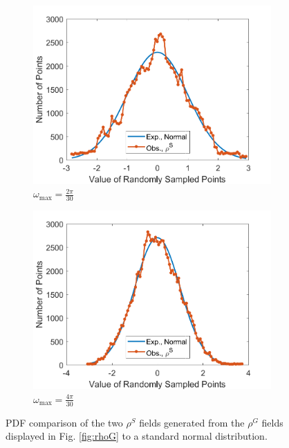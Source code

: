 \documentclass[12pt,dvipsnames]{report}
\begin{document}
\begin{figure}[!ht]
\centering
\begin{subfigure}{.45\textwidth}
	\centering
	\includegraphics[width=1\linewidth]{rhoS_pdf_O2pi-300_L100000_X100_Y100}
	\caption{\small $\omega_{\max}=\frac{2\pi}{30}$}
	\label{fig:rhoS_pdf_2pi-300}
\end{subfigure}
\hspace{0.5cm}
\begin{subfigure}{.45\textwidth}
	\centering
	\includegraphics[width=1\linewidth]{rhoS_pdf_O4pi-300_L100000_X100_Y100}
	\caption{\small $\omega_{\max}=\frac{4\pi}{30}$}
	\label{fig:rhoS_pdf_4pi-300}
\end{subfigure}
\caption[PDF comparisons of example standard normal fields to the standard normal distribution]{\small PDF comparison of the two $\rho^S$ fields generated from the $\rho^G$ fields displayed in Fig. \ref{fig:rhoG} to a standard normal distribution.}
\label{fig:rhoS_pdf}
\end{figure}
\end{document}
